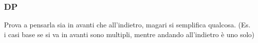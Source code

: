 \subsubsection{DP} Prova a pensarla sia in avanti che all'indietro, magari si semplifica qualcosa. (Es. i casi base se si va in avanti sono multipli, mentre andando all'indietro è uno solo)

